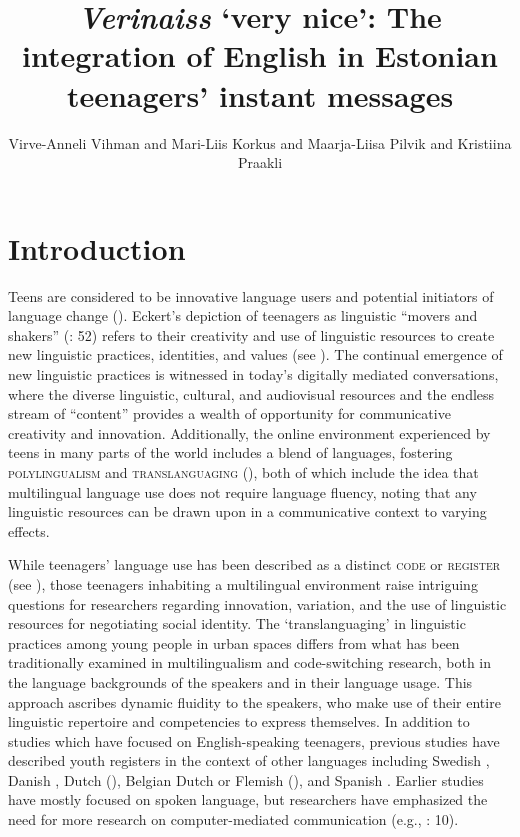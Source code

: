 \documentclass[output=paper]{langscibook}
\author{Virve-Anneli Vihman\orcid{}\affiliation{University of Tartu, Estonia} and Mari-Liis Korkus\orcid{}\affiliation{University of Tartu, Estonia} and Maarja-Liisa Pilvik\orcid{}\affiliation{University of Tartu, Estonia} and Kristiina Praakli\orcid{}\affiliation{University of Tartu, Estonia}}
\title[The integration of English in Estonian teenagers’ instant messages]{\textit{Verinaiss} ‘very nice’:  The integration of English in Estonian teenagers’ instant messages}
\begin{document}
\maketitle 

\section{Introduction}

Teens are considered to be innovative language users and potential initiators of language change (\citealt{Cheshire2005, Leppänen2007}). Eckert’s depiction of teenagers as linguistic “movers and shakers” (\citealt{Eckert1997}: 52) refers to their creativity and use of linguistic resources to create new linguistic practices, identities, and values (see \citealt{StenstromEtAl2002, Nortier2018}). The continual emergence of new linguistic practices is witnessed in today’s digitally mediated conversations, where the diverse linguistic, cultural, and audiovisual resources and the endless stream of “content” provides a wealth of opportunity for communicative creativity and innovation. Additionally, the online environment experienced by teens in many parts of the world includes a blend of languages, fostering \textsc{polylingualism} \citep{Jørgensen2008} and \textsc{translanguaging} (\citealt{García2009, GarciaWei2014}), both of which include the idea that multilingual language use does not require language fluency, noting that any linguistic resources can be drawn upon in a communicative context to varying effects.

While teenagers’ language use has been described as a distinct \textsc{code} or \textsc{register} (see \citealt{Androutsopoulos2005, Tagliamonte2016teen}), those teenagers inhabiting a multilingual environment raise intriguing questions for researchers regarding innovation, variation, and the use of linguistic resources for negotiating social identity. The ‘translanguaging’ in linguistic practices among young people in urban spaces differs from what has been traditionally examined in multilingualism and code-switching research, both in the language backgrounds of the speakers and in their language usage. This approach ascribes dynamic fluidity to the speakers, who make use of their entire linguistic repertoire and competencies to express themselves. In addition to studies which have focused on English-speaking teenagers, previous studies have described youth registers in the context of other languages including Swedish \citep{Kotsinas2004}, Danish \citep{Quist2010}, Dutch (\citealt{SchoonenAppel2005}), Belgian Dutch or Flemish (\citealt{SchuringZenner2022}), and Spanish \citep{Jørgensen2013}. Earlier studies have mostly focused on spoken language, but researchers have emphasized the need for more research on computer-mediated communication (e.g., \citealt{Quist2010}: 10).
\end{document}
